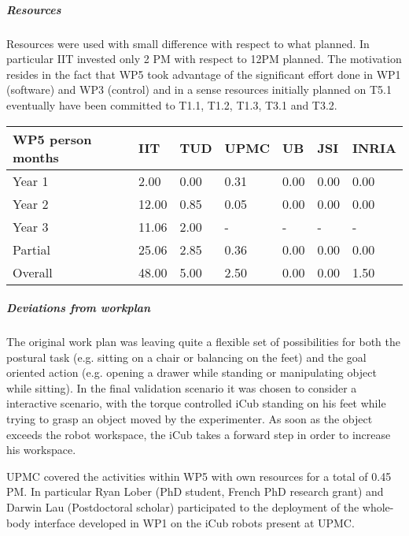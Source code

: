 
\subparagraph{Resources}

Resources were used with small difference with respect to what planned. In particular IIT invested only 2 PM with respect to 12PM planned. The motivation resides in the fact that WP5 took advantage of the significant effort done in WP1 (software) and WP3 (control) and in a sense resources initially planned on T5.1 eventually have been committed to T1.1, T1.2, T1.3, T3.1 and T3.2.

\begin{center}
\begin{tabular}{|C{1.5cm}|C{1.5cm}|C{1.5cm}|C{2cm}|C{2cm}|C{2cm}|C{2cm}|}
\hline
\footnotesize \textbf{WP5 person months}& \footnotesize \textbf{IIT}&\footnotesize \textbf{TUD}&\footnotesize \textbf{UPMC}& \footnotesize \textbf{UB} &\footnotesize \textbf{JSI} & \footnotesize \textbf{INRIA} \\ \hline
\footnotesize Year 1 &  2.00  & 0.00 & 0.31 & 0.00 & 0.00 & 0.00     \\  \hline
\footnotesize Year 2 &  12.00  & 0.85 & 0.05 & 0.00 & 0.00 & 0.00     \\  \hline
\footnotesize Year 3 &  11.06  & 2.00    & - & -    & - & -     \\  \hline
\footnotesize Partial &  25.06 & 2.85 & 0.36 & 0.00 & 0.00 & 0.00 \\ \hline \hline
\footnotesize Overall &  48.00 & 5.00 & 2.50 & 0.00 & 0.00 & 1.50 \\ \hline
\end{tabular}
\end{center}

\subparagraph{Deviations from workplan} 
The original work plan was leaving quite a flexible set of possibilities for both the postural task (e.g. sitting on a chair or balancing on the feet) and the goal oriented action (e.g. opening a drawer while standing or manipulating object while sitting). In the final validation scenario it was chosen to consider a interactive scenario, with the torque controlled iCub standing on his feet while trying to grasp an object moved by the experimenter. As soon as the object exceeds the robot workspace, the iCub takes a forward step in order to increase his workspace. 

UPMC covered the activities within WP5 with own resources for a total of 0.45 PM. In particular Ryan Lober (PhD student, French PhD research grant) and Darwin Lau (Postdoctoral scholar) participated to the deployment of the whole-body interface developed in WP1 on the iCub robots present at UPMC.
